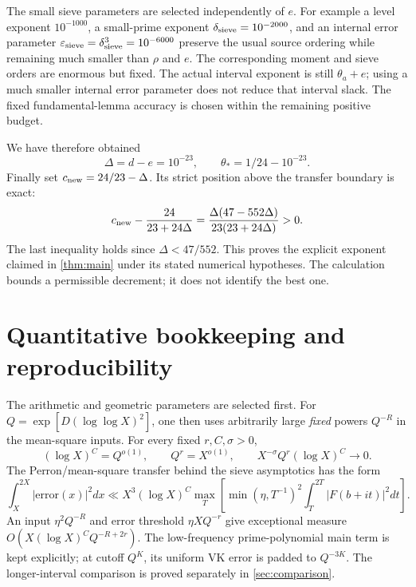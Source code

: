 The small sieve parameters are selected independently of $e$.
For example a level exponent $10^{-1000}$, a small-prime exponent
$\delta_{\rm sieve}=10^{-2000}$, and an internal error parameter
$\varepsilon_{\rm sieve}=\delta_{\rm sieve}^3=10^{-6000}$ preserve the usual
source ordering while remaining much smaller than $\rho$ and $e$.
The corresponding moment and sieve orders are enormous but fixed.
The actual interval exponent is still $\theta_a+e$; using a much
smaller internal error parameter does not reduce that interval slack.
The fixed fundamental-lemma accuracy is chosen within the remaining
positive budget.

We have therefore obtained
\[
                \Delta=d-e=10^{-23},\qquad
                \theta_*=1/24-10^{-23}.
\]
Finally set $c_{\rm new}=24/23-\Delta$.
Its strict position above the transfer boundary is exact:
\[
 c_{\rm new}-\frac{24}{23+24\Delta}
   =\frac{\Delta(47-552\Delta)}{23(23+24\Delta)}>0.
\]
The last inequality holds since $\Delta<47/552$.
This proves the explicit exponent claimed in \cref{thm:main} under
its stated numerical hypotheses. The calculation bounds a permissible
decrement; it does not identify the best one.

\section{Quantitative bookkeeping and reproducibility}\label{app:reproduce}

The arithmetic and geometric parameters are selected first.
For $Q=\exp[D(\log\log X)^2]$, one then uses arbitrarily large
\emph{fixed} powers $Q^{-R}$ in the mean-square inputs.
For every fixed $r,C,\sigma>0$,
\[
 (\log X)^C=Q^{o(1)},\qquad Q^r=X^{o(1)},\qquad
 X^{-\sigma}Q^r(\log X)^C\longrightarrow0.
\]
The Perron/mean-square transfer behind the sieve asymptotics has
the form
\[
 \int_X^{2X}|\mathrm{error}(x)|^2dx
 \ll X^3(\log X)^C
       \max_T\left[\min(\eta,T^{-1})^2
                       \int_T^{2T}|F(b+it)|^2dt\right].
\]
An input $\eta^2Q^{-R}$ and error threshold $\eta XQ^{-r}$ give
exceptional measure $O(X(\log X)^CQ^{-R+2r})$.
The low-frequency prime-polynomial main term is kept explicitly;
at cutoff $Q^K$, its uniform VK error is padded to $Q^{-3K}$.
The longer-interval comparison is proved separately in \cref{sec:comparison}.

